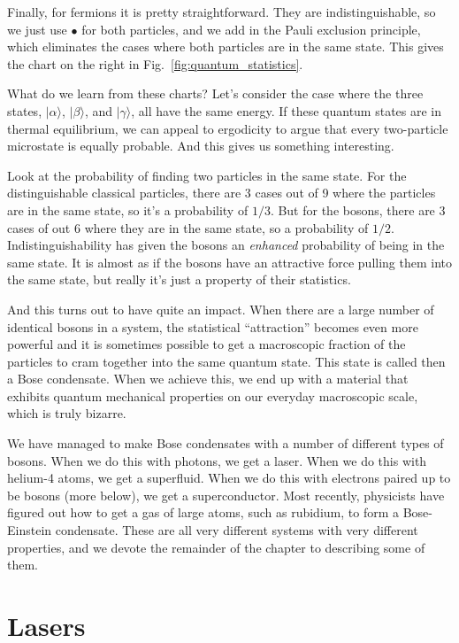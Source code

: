 Finally, for fermions it is pretty straightforward.  They are
indistinguishable, so we just use $\bullet$ for both particles, and we
add in the Pauli exclusion principle, which eliminates the cases where
both particles are in the same state.  This gives the chart on the
right in Fig.~\ref{fig:quantum_statistics}.

What do we learn from these charts?  Let's consider the case where the
three states, $|\alpha\rangle$, $|\beta\rangle$, and $|\gamma\rangle$,
all have the same energy.  If these quantum states are in thermal
equilibrium, we can appeal to ergodicity to argue that every
two-particle microstate is equally probable.  And this gives us
something interesting.

Look at the probability of finding two particles in the same state.
For the distinguishable classical particles, there are 3 cases out of
9 where the particles are in the same state, so it's a probability of
$1/3$.  But for the bosons, there are 3 cases of out 6 where they are
in the same state, so a probability of $1/2$.  Indistinguishability
has given the bosons an \textit{enhanced} probability of being in the
same state.  It is almost as if the bosons have an attractive force
pulling them into the same state, but really it's just a property of
their statistics.

And this turns out to have quite an impact.  When there are a large
number of identical bosons in a system, the statistical ``attraction''
becomes even more powerful and it is sometimes possible to get a
macroscopic fraction of the particles to cram together into the same
quantum state.  This state is called then a Bose condensate.  When we
achieve this, we end up with a material that exhibits quantum
mechanical properties on our everyday macroscopic scale, which is
truly bizarre.

We have managed to make Bose condensates with a number of different
types of bosons.  When we do this with photons, we get a laser.  When we
do this with helium-4 atoms, we get a superfluid.  When we do this with
electrons paired up to be bosons (more below), we get a superconductor.
Most recently, physicists have figured out how to get a gas of large atoms,
such as rubidium, to form a Bose-Einstein condensate.  These are all very
different systems with very different properties, and we devote the remainder
of the chapter to describing some of them.

\section{Lasers}

